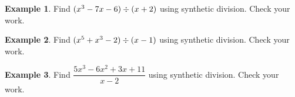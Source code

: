 \documentclass[addpoints,12pt]{exam}
\theoremstyle{definition}
\theoremstyle{break}
\theoremstyle{break}
\newtheorem{example}{Example}[subsection]
\begin{document}
\begin{example}
Find $(x^3 - 7x - 6) \divisionsymbol (x + 2)$ using synthetic division. Check your work.
\vspace{2.5in}
\end{example}

\begin{example}
Find $(x^5 + x^3 - 2) \divisionsymbol (x-1)$ using synthetic division. Check your work.
\end{example}

\newpage

\begin{example}
Find $\dfrac{5x^3 - 6x^2 + 3x + 11}{x-2}$ using synthetic division. Check your work.
\end{example}
\end{document}
